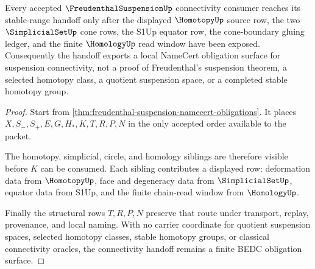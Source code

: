 \begin{theorem}
\label{thm:freudenthal-suspension-connectivity-handoff}
Every accepted $\FreudenthalSuspensionUp$ connectivity consumer reaches its stable-range handoff only after the displayed $\HomotopyUp$ source row, the two $\SimplicialSetUp$ cone rows, the S1Up equator row, the cone-boundary gluing ledger, and the finite $\HomologyUp$ read window have been exposed. Consequently the handoff exports a local NameCert obligation surface for suspension connectivity, not a proof of Freudenthal's suspension theorem, a selected homotopy class, a quotient suspension space, or a completed stable homotopy group.
\end{theorem}
\begin{proof}
Start from \autoref{thm:freudenthal-suspension-namecert-obligations}. It places $X,S_-,S_+,E,G,H_*,K,T,R,P,N$ in the only accepted order available to the packet.

The homotopy, simplicial, circle, and homology siblings are therefore visible before $K$ can be consumed. Each sibling contributes a displayed row: deformation data from $\HomotopyUp$, face and degeneracy data from $\SimplicialSetUp$, equator data from S1Up, and the finite chain-read window from $\HomologyUp$.

Finally the structural rows $T,R,P,N$ preserve that route under transport, replay, provenance, and local naming. With no carrier coordinate for quotient suspension spaces, selected homotopy classes, stable homotopy groups, or classical connectivity oracles, the connectivity handoff remains a finite BEDC obligation surface.
\end{proof}


\begin{closurestatus}{\FreudenthalSuspensionUp}
  \theoryclosure{\seedClosure}
  \formalstatus{\unformalizedV}
\end{closurestatus}
